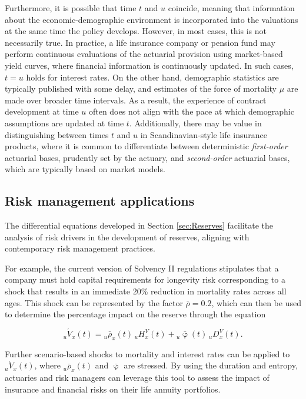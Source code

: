 \documentclass[12pt]{article}
\begin{document}
Furthermore, it is possible that time \( t \) and \( u \) coincide, meaning that information about the economic-demographic environment is incorporated into the valuations at the same time the policy develops. However, in most cases, this is not necessarily true. In practice, a life insurance company or pension fund may perform continuous evaluations of the actuarial provision using market-based yield curves, where financial information is continuously updated. In such cases, \( t = u \) holds for interest rates. On the other hand, demographic statistics are typically published with some delay, and estimates of the force of mortality \( \mu \) are made over broader time intervals. As a result, the experience of contract development at time \( u \) often does not align with the pace at which demographic assumptions are updated at time \( t \). Additionally, there may be value in distinguishing between times \( t \) and \( u \) in Scandinavian-style life insurance products, where it is common to differentiate between deterministic \textit{first-order} actuarial bases, prudently set by the actuary, and \textit{second-order} actuarial bases, which are typically based on market models.


\subsection{Risk management applications}

The differential equations developed in Section \ref{sec:Reserves} facilitate the analysis of risk drivers in the development of reserves, aligning with contemporary risk management practices.

For example, the current version of Solvency II regulations stipulates that a company must hold capital requirements for longevity risk corresponding to a shock that results in an immediate 20\% reduction in mortality rates across all ages. This shock can be represented by the factor \( \bar{\rho} = 0.2 \), which can then be used to determine the percentage impact on the reserve through the equation 

\[
{}_u\acute{V}_x(t) = {}_u\bar{\rho}_x(t) \, {}_uH_x^V(t) + {}_u\bar{\upvarphi}(t) \, {}_uD_x^V(t).
\]

Further scenario-based shocks to mortality and interest rates can be applied to \( {}_u\acute{V}_x(t) \), where \( {}_u\bar{\rho}_x(t) \) and \( \bar{\upvarphi} \) are stressed. By using the duration and entropy, actuaries and risk managers can leverage this tool to assess the impact of insurance and financial risks on their life annuity portfolios.
\end{document}
